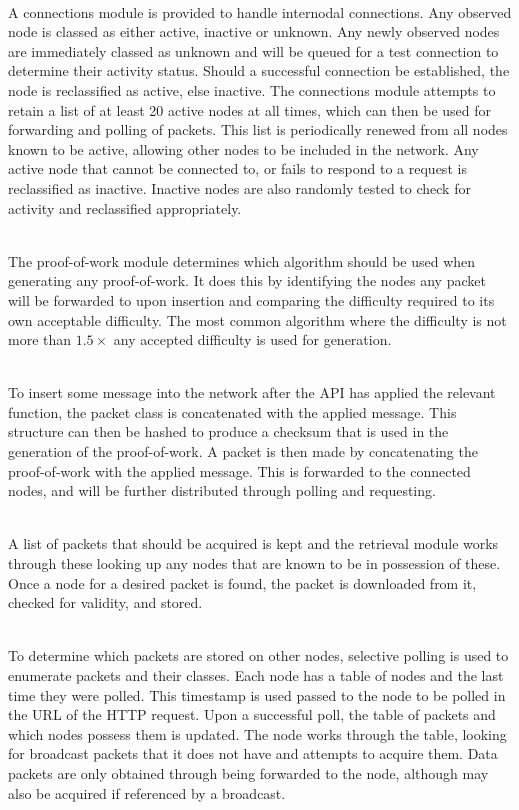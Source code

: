 		\begin{description}[topsep=-5pt,itemsep=-1ex,partopsep=2ex,parsep=1.5ex]
			\item[Connection Module] \hfill \\
				A connections module is provided to handle internodal connections. Any observed node is classed as either active, inactive or unknown. Any newly observed nodes are immediately classed as unknown and will be queued for a test connection to determine their activity status. Should a successful connection be established, the node is reclassified as active, else inactive. The connections module attempts to retain a list of at least 20 active nodes at all times, which can then be used for forwarding and polling of packets. This list is periodically renewed from all nodes known to be active, allowing other nodes to be included in the network. Any active node that cannot be connected to, or fails to respond to a request is reclassified as inactive. Inactive nodes are also randomly tested to check for activity and reclassified appropriately.
			\item[Proof-of-Work Module] \hfill \\
				The proof-of-work module determines which algorithm should be used when generating any proof-of-work. It does this by identifying the nodes any packet will be forwarded to upon insertion and comparing the difficulty required to its own acceptable difficulty. The most common algorithm where the difficulty is not more than $1.5\times$ any accepted difficulty is used for generation.
			\item[Insertion Module] \hfill \\
				To insert some message into the network after the API has applied the relevant function, the packet class is concatenated with the applied message. This structure can then be hashed to produce a checksum that is used in the generation of the proof-of-work. A packet is then made by concatenating the proof-of-work with the applied message. This is forwarded to the connected nodes, and will be further distributed through polling and requesting.
			\item[Retrieval Module] \hfill \\
				A list of packets that should be acquired is kept and the retrieval module works through these looking up any nodes that are known to be in possession of these. Once a node for a desired packet is found, the packet is downloaded from it, checked for validity, and stored.
			\item[Polling Module] \hfill \\
				To determine which packets are stored on other nodes, selective polling is used to enumerate packets and their classes. Each node has a table of nodes and the last time they were polled. This timestamp is used passed to the node to be polled in the URL of the HTTP request. Upon a successful poll, the table of packets and which nodes possess them is updated. The node works through the table, looking for broadcast packets that it does not have and attempts to acquire them. Data packets are only obtained through being forwarded to the node, although may also be acquired if referenced by a broadcast.
			\end{description}

